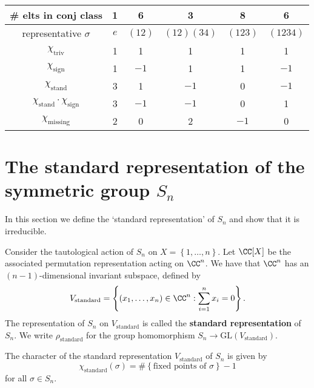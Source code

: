\documentclass[12pt, a4paper]{article}
\newcommand{\gl}{\text{GL}}
\begin{document}
\begin{center}
    \begin{tabular}{c|ccccc}
        \# elts in conj class & 1 & 6 & 3 & 8 & 6 \\
        \hline
        representative $\sigma$ & \(e\) & \((12)\) & \((12)(34)\) & \((123)\) & \((1234)\) \\
        \hline
        $\chi_{\text{triv}}$ & 1 & 1 & 1 & 1 & 1 \\
        $\chi_{\text{sign}}$ & 1 & $-1$ & 1 & 1 & $-1$ \\
        $\chi_{\text{stand}}$ & 3 & 1 & $-1$ & 0 & $-1$ \\
        $\chi_{\text{stand}} \cdot \chi_{\text{sign}}$ & 3 & $-1$ & $-1$ & 0 & 1 \\
        $\chi_{\text{missing}}$ & 2 & 0 & 2 & $-1$ & 0 \\
    \end{tabular}    
\end{center}

\section{The standard representation of the symmetric group \texorpdfstring{\(S_n\)}{TEXT}}

\begin{mdnote}
    In this section we define the `standard representation' of \(S_n\) and show that it is irreducible.
\end{mdnote}

\begin{definition}
    Consider the tautological action of \(S_n\) on \(X=\left\{ 1,\ldots,n \right\}\). Let \(\CC[X]\) be the associated permutation representation acting on \(\CC^n\). We have that \(\CC^n\) has an \((n-1)\)-dimensional invariant subspace, defined by 
    \[V_{\text{standard}} = \left\{ (x_1,\ldots,x_n) \in \CC^n : \sum_{i=1}^n x_i=0 \right\}.\]
    The representation of \(S_n\) on \(V_{\text{standard}}\) is called the \textbf{standard representation} of \(S_n\). We write \(\rho_{\text{standard}}\) for the group homomorphism \(S_n \to \gl\left( V_{\text{standard}} \right)\).
\end{definition}

\begin{mdlemma}
    The character of the standard representation \(V_{\text{standard}}\) of \(S_n\) is given by 
    \[\chi_{\text{standard}}(\sigma) = \#\left\{ \text{fixed points of \(\sigma\)} \right\}-1\]
    for all \(\sigma \in S_n\). 
\end{mdlemma}
\end{document}
